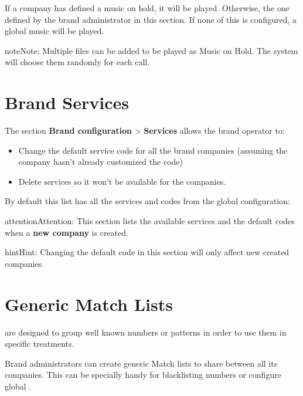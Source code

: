 \documentclass[letterpaper,10pt,english]{sphinxmanual}
\begin{document}
If a company has defined a music on hold, it will be played. Otherwise, the
one defined by the brand administrator in this section. If none of this is configured,
a global music will be played.

\begin{notice}{note}{Note:}
Multiple files can be added to be played as Music on Hold. The system
will choose them randomly for each call.
\end{notice}


\section{Brand Services}
\label{brand/services::doc}\label{brand/services:brand-services}\label{brand/services:id1}
The section \textbf{Brand configuration} \textgreater{} \textbf{Services} allows the brand operator to:
\begin{itemize}
\item {} 
Change the default service code for all the brand companies (assuming the
company hasn't already customized the code)

\item {} 
Delete services so it won't be available for the companies.

\end{itemize}

By default this list has all the services and codes from the global
configuration:

\begin{notice}{attention}{Attention:}
This section lists the available services and the default codes
when a \textbf{new company} is created.
\end{notice}

\begin{notice}{hint}{Hint:}
Changing the default code in this section will only affect new
created companies.
\end{notice}


\section{Generic Match Lists}
\label{brand/match_lists:generic-match-lists}\label{brand/match_lists::doc}\label{brand/match_lists:brand-match-lists}
{\hyperref[company/match_lists:match\string-lists]{}} are designed to group well known numbers or patterns in order to use
them in specific treatments.

Brand administrators can create generic Match lists to share between all its companies.
This can be specially handy for blacklisting numbers or configure global {\hyperref[company/call_permissions:call\string-acl\string-matchlits]{}}.
\end{document}
